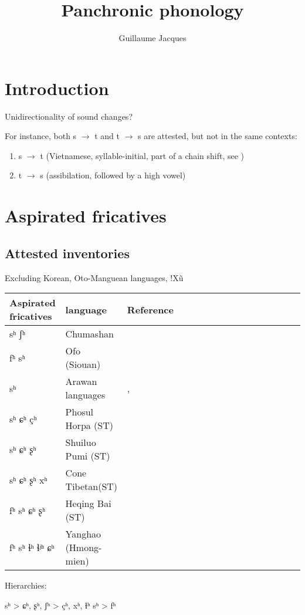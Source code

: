 \documentclass[oldfontcommands,oneside,a4paper,11pt]{article}
\begin{document}
 
\linenumbers
\title{Panchronic phonology}
\author{Guillaume Jacques}
\maketitle
\section{Introduction}
Unidirectionality of sound changes? 

For instance, both s $\rightarrow$ t and t $\rightarrow$ s are attested, but not in the same contexts:

\begin{enumerate}

\item s $\rightarrow$ t (Vietnamese, syllable-initial, part of a chain shift, see \citealt{ferlus82spirantisation})
\item t $\rightarrow$ s (assibilation, followed by a high vowel)

\end{enumerate}



\section{Aspirated fricatives}
\citet{jacques11lingua}

\subsection{Attested inventories}
 
Excluding Korean, Oto-Manguean languages, !Xũ
\begin{table}[H] \centering
\begin{tabular}{llllllllllllllll}
\toprule
Aspirated fricatives & language & Reference\\
\midrule
sʰ ʃʰ & Chumashan &\citet{klar77chumashan}\\
fʰ sʰ& Ofo (Siouan)& \citet{reuse81ofo} \\
sʰ & Arawan languages  &\citet{dixon04arawa},
\citet{dienst05kulina}\\
sʰ ɕʰ çʰ & Phosul Horpa (ST)&\citet{jackson00puxi} \\
sʰ ɕʰ ʂʰ & Shuiluo Pumi (ST)&\citet{jacques11lingua} \\
sʰ ɕʰ ʂʰ xʰ & Cone Tibetan(ST) &\citet{jacques11lingua} \\
fʰ sʰ ɕʰ ʂʰ   & Heqing Bai (ST) &\citet{wang06songqi} \\
fʰ sʰ ɬʰ ɬʲʰ ɕʰ   & Yanghao (Hmong-mien) &\citet{ratliff10protohm}\\
\bottomrule
\end{tabular}

Hierarchies:

\begin{exe}
\ex 
\glt sʰ > {ɕʰ, ʂʰ, ʃʰ} > {çʰ, xʰ, ɬʰ}
\glt sʰ > fʰ
\end{exe}
\end{table}
\end{document}
